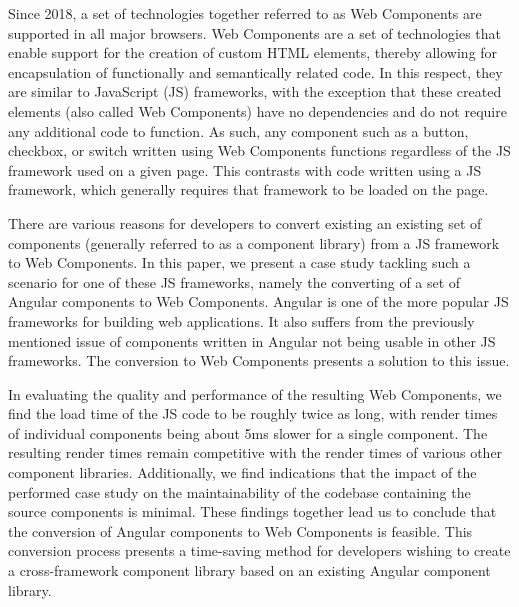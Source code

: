 Since 2018, a set of technologies together referred to as Web Components are supported in all major browsers. Web Components are a set of technologies that enable support for the creation of custom HTML elements, thereby allowing for encapsulation of functionally and semantically related code. In this respect, they are similar to JavaScript (JS) frameworks, with the exception that these created elements (also called Web Components) have no dependencies and do not require any additional code to function. As such, any component such as a button, checkbox, or switch written using Web Components functions regardless of the JS framework used on a given page. This contrasts with code written using a JS framework, which generally requires that framework to be loaded on the page.

There are various reasons for developers to convert existing an existing set of components (generally referred to as a component library) from a JS framework to Web Components. In this paper, we present a case study tackling such a scenario for one of these JS frameworks, namely the converting of a set of Angular components to Web Components. Angular is one of the more popular JS frameworks for building web applications. It also suffers from the previously mentioned issue of components written in Angular not being usable in other JS frameworks. The conversion to Web Components presents a solution to this issue.

In evaluating the quality and performance of the resulting Web Components, we find the load time of the JS code to be roughly twice as long, with render times of individual components being about 5ms slower for a single component. The resulting render times remain competitive with the render times of various other component libraries. Additionally, we find indications that the impact of the performed case study on the maintainability of the codebase containing the source components is minimal. These findings together lead us to conclude that the conversion of Angular components to Web Components is feasible. This conversion process presents a time-saving method for developers wishing to create a cross-framework component library based on an existing Angular component library.